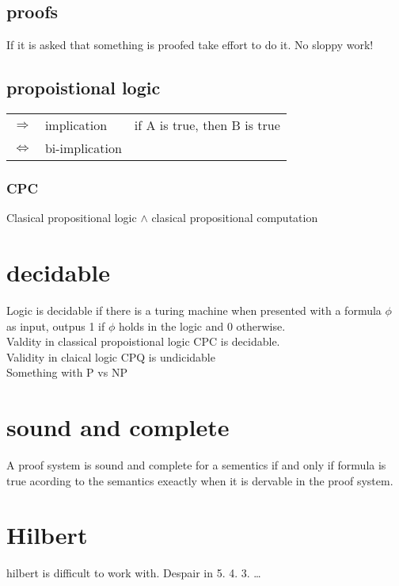 \documentclass{report}
\begin{document}
\subsection{proofs}

If it is asked that something is proofed take effort to do it. No sloppy work!

\subsection{propoistional logic}

\begin{tabular}{@{}lll@{}}
$\Rightarrow$ & implication & if A is true, then B is true \\
$\iff$ & bi-implication

\end{tabular}

\subsubsection{CPC}
Clasical propositional logic $\wedge$ clasical propositional computation

\section{decidable}

Logic is decidable if there is a turing machine when presented with a formula
$\phi$ as input, outpus 1 if $\phi$ holds in the logic and 0 otherwise. \\

Valdity in classical propoistional logic CPC is decidable. \\
Validity in claical logic CPQ is undicidable \\

Something with P vs NP

\section{sound and complete}
A proof system is sound and complete for a sementics if and only if formula
is true acording to the semantics exeactly when it is dervable in the proof
system.

\section{Hilbert}

hilbert is difficult to work with. Despair in 5. 4. 3. \dots
\end{document}
